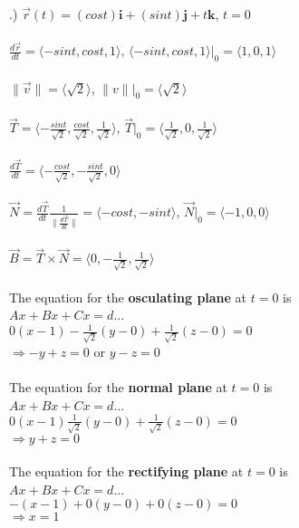 \documentclass[12pt]{article}
\begin{document}
.) $\vec{r}(t) = (cos{t})\mathbf{i} + (sin{t})\mathbf{j} + t\mathbf{k}$, \hspace{10pt} $t = 0$\\\\
\noindent $\frac{d\vec{r}}{dt} = \langle -sin{t}, cos{t}, 1\rangle$,
 \hspace{10pt} $\langle -sin{t}, cos{t}, 1\rangle \Big|_{0} = \langle 1, 0, 1\rangle$\\\\
\noindent $\| \vec{v} \| = \langle \sqrt{2}\rangle$, \hspace{10pt} $\| v \| \Big|_{0} = \langle \sqrt{2} \rangle$\\\\
\noindent $\vec{T} = \langle -\frac{sin{t}}{\sqrt{2}}, \frac{cos{t}}{\sqrt{2}}, \frac{1}{\sqrt{2}}\rangle$,
 \hspace{10pt} $\vec{T}\Big|_{0} = \langle \frac{1}{\sqrt{2}}, 0, \frac{1}{\sqrt{2}}\rangle$\\\\
\noindent $\frac{d\vec{T}}{dt} = \langle -\frac{cos{t}}{\sqrt{2}}, -\frac{sin{t}}{\sqrt{2}}, 0 \rangle$\\\\
\noindent $\vec{N} = \frac{d\vec{T}}{dt}\frac{1}{\| \frac{d\vec{T}}{dt}\| } = \langle -cos{t}, -sin{t}\rangle$, \hspace{10pt}
 $\vec{N}\Big|_{0} = \langle -1, 0, 0\rangle$\\\\
\noindent $\vec{B} = \vec{T} \times \vec{N} = \langle 0, -\frac{1}{\sqrt{2}}, \frac{1}{\sqrt{2}}\rangle$\\\\
\noindent The equation for the \textbf{osculating plane} at $t = 0$ is \\$Ax + Bx + Cx  = d$...\\
$0(x - 1) - \frac{1}{\sqrt{2}}(y - 0) + \frac{1}{\sqrt{2}} (z - 0) = 0$\\
\noindent $\Rightarrow -y+z = 0$ or $y - z = 0$\\\\
\noindent The equation for the \textbf{normal plane} at $t = 0$ is \\$ Ax + Bx + Cx  = d$...\\
$0(x - 1)  \frac{1}{\sqrt{2}}(y - 0) + \frac{1}{\sqrt{2}} (z - 0) = 0$\\
\noindent $\Rightarrow y+z = 0$\\\\ 
\noindent The equation for the \textbf{rectifying plane} at $t = 0$ is \\$ Ax + Bx + Cx  = d$...\\
$-(x - 1) + 0(y - 0) + 0(z - 0) = 0$\\
\noindent $\Rightarrow x = 1$\\\\ 
\end{document}
